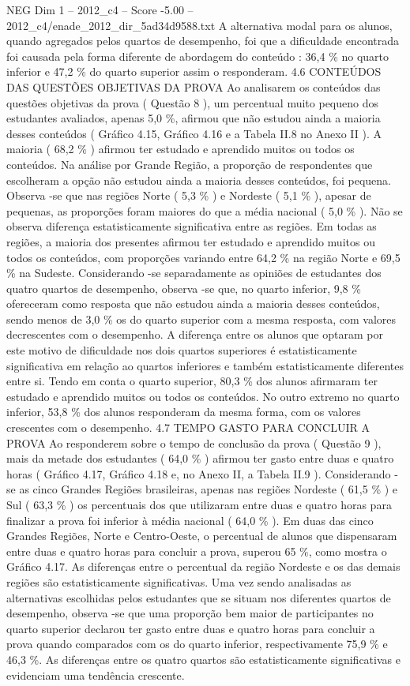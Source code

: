\begin{textsample}{NEG Dim 1 – 2012\_c4 – Score -5.00 – 2012\_c4/enade\_2012\_dir\_5ad34d9588.txt}
A alternativa modal para os alunos, quando agregados pelos quartos de desempenho, foi que a dificuldade encontrada foi causada pela forma diferente de abordagem do conteúdo : 36,4 \% no quarto inferior e 47,2 \% do quarto superior assim o responderam. 4.6 CONTEÚDOS DAS QUESTÕES OBJETIVAS DA PROVA Ao analisarem os conteúdos das questões objetivas da prova ( Questão 8 ), um percentual muito pequeno dos estudantes avaliados, apenas 5,0 \%, afirmou que não estudou ainda a maioria desses conteúdos ( Gráfico 4.15, Gráfico 4.16 e a Tabela II.8 no Anexo II ).
A maioria ( 68,2 \% ) afirmou ter estudado e aprendido muitos ou todos os conteúdos.
Na análise por Grande Região, a proporção de respondentes que escolheram a opção não estudou ainda a maioria desses conteúdos, foi pequena.
Observa -se que nas regiões Norte ( 5,3 \% ) e Nordeste ( 5,1 \% ), apesar de pequenas, as proporções foram maiores do que a média nacional ( 5,0 \% ).
Não se observa diferença estatisticamente significativa entre as regiões.
Em todas as regiões, a maioria dos presentes afirmou ter estudado e aprendido muitos ou todos os conteúdos, com proporções variando entre 64,2 \% na região Norte e 69,5 \% na Sudeste.
Considerando -se separadamente as opiniões de estudantes dos quatro quartos de desempenho, observa -se que, no quarto inferior, 9,8 \% ofereceram como resposta que não estudou ainda a maioria desses conteúdos, sendo menos de 3,0 \% os do quarto superior com a mesma resposta, com valores decrescentes com o desempenho.
A diferença entre os alunos que optaram por este motivo de dificuldade nos dois quartos superiores é estatisticamente significativa em relação ao quartos inferiores e também estatisticamente diferentes entre si.
Tendo em conta o quarto superior, 80,3 \% dos alunos afirmaram ter estudado e aprendido muitos ou todos os conteúdos.
No outro extremo no quarto inferior, 53,8 \% dos alunos responderam da mesma forma, com os valores crescentes com o desempenho. 4.7 TEMPO GASTO PARA CONCLUIR A PROVA Ao responderem sobre o tempo de conclusão da prova ( Questão 9 ), mais da metade dos estudantes ( 64,0 \% ) afirmou ter gasto entre duas e quatro horas ( Gráfico 4.17, Gráfico 4.18 e, no Anexo II, a Tabela II.9 ).
Considerando -se as cinco Grandes Regiões brasileiras, apenas nas regiões Nordeste ( 61,5 \% ) e Sul ( 63,3 \% ) os percentuais dos que utilizaram entre duas e quatro horas para finalizar a prova foi inferior à média nacional ( 64,0 \% ).
Em duas das cinco Grandes Regiões, Norte e Centro-Oeste, o percentual de alunos que dispensaram entre duas e quatro horas para concluir a prova, superou 65 \%, como mostra o Gráfico 4.17.
As diferenças entre o percentual da região Nordeste e os das demais regiões são estatisticamente significativas.
Uma vez sendo analisadas as alternativas escolhidas pelos estudantes que se situam nos diferentes quartos de desempenho, observa -se que uma proporção bem maior de participantes no quarto superior declarou ter gasto entre duas e quatro horas para concluir a prova quando comparados com os do quarto inferior, respectivamente 75,9 \% e 46,3 \%.
As diferenças entre os quatro quartos são estatisticamente significativas e evidenciam uma tendência crescente.


\end{textsample}
